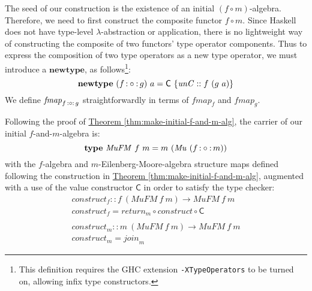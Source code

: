 \documentclass{jfp1}
\newcommand{\thmref}[1]{\hyperref[#1]{Theorem \ref*{#1}}}
\newcommand{\kw}[1]{\textbf{#1}}
\begin{document}
The seed of our construction is the existence of an initial $(f \circ
m)$-algebra. Therefore, we need to first construct the composite
functor $f \circ m$. Since Haskell does not have type-level
$\lambda$-abstraction or application, there is no lightweight way of
constructing the composite of two functors' type operator
components. Thus to express the composition of two type operators as
a new type operator, we must introduce a $\kw{newtype}$, as
follows\footnote{This definition requires the GHC extension
  \texttt{-XTypeOperators} to be turned on, allowing infix type
  constructors.}:
\begin{displaymath}
  \kw{newtype}~(f \fcompose g)~a = \mathsf{C}~\{\mathit{unC} :: f~(g~a) \}
\end{displaymath}
We define $\mathit{fmap}_{f\mathop{\mathord:\circ\mathord:} g}$ straightforwardly in terms of
$\mathit{fmap}_f$ and $\mathit{fmap}_g$.

Following the proof of \thmref{thm:make-initial-f-and-m-alg}, the
carrier of our initial $f$-and-$m$-algebra is:
\begin{displaymath}
  \kw{type}~\mathit{MuFM}~f~m = m~(\mathit{Mu}~(f \fcompose m))
\end{displaymath}
with the $f$-algebra and $m$-Eilenberg-Moore-algebra structure maps
defined following the construction in
\thmref{thm:make-initial-f-and-m-alg}, augmented with a use of the
value constructor $\mathsf{C}$ in order to satisfy the type checker:
\begin{displaymath}
  \begin{array}{l}
    \mathit{construct}_f :: f~(\mathit{MuFM}~f~m) \to \mathit{MuFM}~f~m \\
    \mathit{construct}_f = \mathit{return}_m \circ \mathit{construct} \circ \mathsf{C} \\
    \\
    \mathit{construct}_m :: m~(\mathit{MuFM}~f~m) \to \mathit{MuFM}~f~m \\
    \mathit{construct}_m = \mathit{join}_m
  \end{array}
\end{displaymath}
\end{document}
